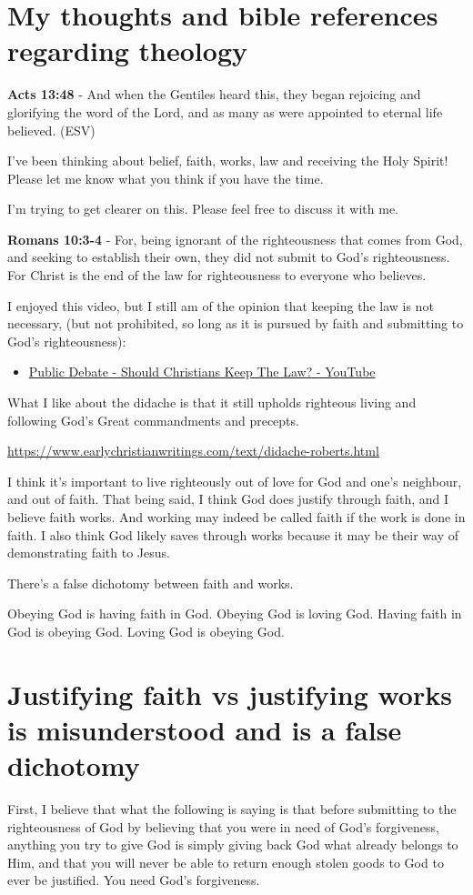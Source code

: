\documentclass[11pt]{article}
\author{root}
\date{\today}
\title{}
\begin{document}
\section{My thoughts and bible references regarding theology}
\label{sec:orgf5cfa35}
\textbf{Acts 13:48} - And when the Gentiles heard this, they began rejoicing and glorifying the word of the Lord, and as many as were appointed to eternal life believed. (ESV)

I've been thinking about belief, faith, works, law and receiving the Holy Spirit!
Please let me know what you think if you have the time.

I'm trying to get clearer on this.
Please feel free to discuss it with me.

\textbf{Romans 10:3-4} - For, being ignorant of the righteousness that comes from God, and seeking to establish their own, they did not submit to God's righteousness. For Christ is the end of the law for righteousness to everyone who believes.

I enjoyed this video, but I still am of the opinion that keeping the law is not necessary, (but not prohibited, so long as it is pursued by faith and submitting to God's righteousness):
\begin{itemize}
\item \href{https://www.youtube.com/watch?v=CNHKqhwu6Bo}{Public Debate - Should Christians Keep The Law? - YouTube}
\end{itemize}

What I like about the didache is that it still upholds righteous living and following God's Great commandments and precepts.

\url{https://www.earlychristianwritings.com/text/didache-roberts.html}

I think it's important to live righteously out of love for God and one's neighbour, and out of faith.
That being said, I think God does justify through faith, and I believe faith works. And working may indeed be called faith if the work is done in faith.
I also think God likely saves through works because it may be their way of demonstrating faith to Jesus.

There's a false dichotomy between faith and works.

Obeying God is having faith in God. Obeying God is loving God.
Having faith in God is obeying God. Loving God is obeying God. 

\section{Justifying faith vs justifying works is misunderstood and is a false dichotomy}
\label{sec:org85a6568}
First, I believe that what the following is saying is that before submitting to the righteousness of God by believing that you were in need of God's forgiveness,
anything you try to give God is simply giving back God what already belongs to Him, and that you will never be able to return enough stolen goods to God to ever be justified.
You need God's forgiveness.
\end{document}

